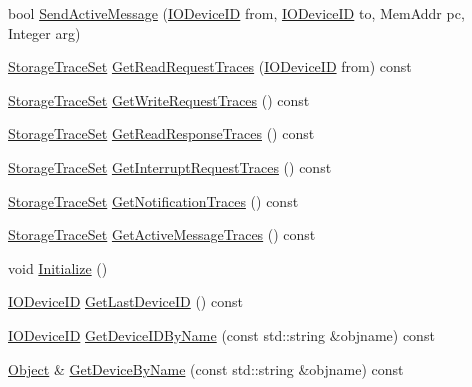 \begin{DoxyCompactItemize}
\item 
bool \hyperlink{class_simulator_1_1_null_i_o_ae5c09fceb19e9a9b8df9d54aa4e7551c}{Send\+Active\+Message} (\hyperlink{namespace_simulator_a3493d987c866ad6b8aaa704c42502db0}{I\+O\+Device\+I\+D} from, \hyperlink{namespace_simulator_a3493d987c866ad6b8aaa704c42502db0}{I\+O\+Device\+I\+D} to, Mem\+Addr pc, Integer arg)
\item 
\hyperlink{class_simulator_1_1_storage_trace_set}{Storage\+Trace\+Set} \hyperlink{class_simulator_1_1_null_i_o_ac304a032290459d8faea44899133f602}{Get\+Read\+Request\+Traces} (\hyperlink{namespace_simulator_a3493d987c866ad6b8aaa704c42502db0}{I\+O\+Device\+I\+D} from) const 
\item 
\hyperlink{class_simulator_1_1_storage_trace_set}{Storage\+Trace\+Set} \hyperlink{class_simulator_1_1_null_i_o_a882ad2172b1e29268ac6708ee16bb51a}{Get\+Write\+Request\+Traces} () const 
\item 
\hyperlink{class_simulator_1_1_storage_trace_set}{Storage\+Trace\+Set} \hyperlink{class_simulator_1_1_null_i_o_a850ae92a7e0e01a896ffa7da7d910a8e}{Get\+Read\+Response\+Traces} () const 
\item 
\hyperlink{class_simulator_1_1_storage_trace_set}{Storage\+Trace\+Set} \hyperlink{class_simulator_1_1_null_i_o_ac769be990b32751e7638280ec10de6d2}{Get\+Interrupt\+Request\+Traces} () const 
\item 
\hyperlink{class_simulator_1_1_storage_trace_set}{Storage\+Trace\+Set} \hyperlink{class_simulator_1_1_null_i_o_abfc63aab4f82f11219aa3400f78d9586}{Get\+Notification\+Traces} () const 
\item 
\hyperlink{class_simulator_1_1_storage_trace_set}{Storage\+Trace\+Set} \hyperlink{class_simulator_1_1_null_i_o_a13e5a4e6a7249c6a67f9abaecc96df91}{Get\+Active\+Message\+Traces} () const 
\item 
void \hyperlink{class_simulator_1_1_null_i_o_a66ef6ef474f545e3ad519097f8af6db6}{Initialize} ()
\item 
\hyperlink{namespace_simulator_a3493d987c866ad6b8aaa704c42502db0}{I\+O\+Device\+I\+D} \hyperlink{class_simulator_1_1_null_i_o_a13e1a1184456bcb5bb17a54ccf254cf8}{Get\+Last\+Device\+I\+D} () const 
\item 
\hyperlink{namespace_simulator_a3493d987c866ad6b8aaa704c42502db0}{I\+O\+Device\+I\+D} \hyperlink{class_simulator_1_1_null_i_o_a10d530d9bca32171bb398d3685b94a8b}{Get\+Device\+I\+D\+By\+Name} (const std\+::string \&objname) const 
\item 
\hyperlink{class_simulator_1_1_object}{Object} \& \hyperlink{class_simulator_1_1_null_i_o_ace4f407dcb51315c0c859bf7da9eafb7}{Get\+Device\+By\+Name} (const std\+::string \&objname) const 

\end{DoxyCompactItemize}
